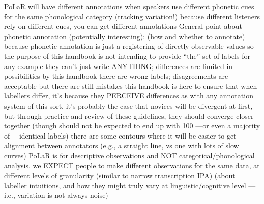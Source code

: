 \markdownRendererUlItem PoLaR will have different annotations when speakers use different phonetic cues for the same phonological category (tracking variation!)\markdownRendererUlItemEnd 
\markdownRendererUlItem because different listeners rely on different cues, you can get different annotations\markdownRendererUlItemEnd 
\markdownRendererUlEndTight \markdownRendererUlItemEnd 
\markdownRendererUlEndTight \markdownRendererUlItemEnd 
\markdownRendererUlItem General point about phonetic annotation (potentially interesting):  (how and whether to annotate) because phonetic annotation is just a registering of directly-observable values\markdownRendererInterblockSeparator
{}\markdownRendererUlBeginTight
\markdownRendererUlItem so the purpose of this handbook is not intending to provide  “the” set of labels for any example\markdownRendererInterblockSeparator
{}\markdownRendererUlBeginTight
\markdownRendererUlItem they can’t just write ANYTHING; differences are limited in possibilities by this handbook\markdownRendererInterblockSeparator
{}\markdownRendererUlBeginTight
\markdownRendererUlItem there are wrong labels; disagreements are acceptable but there are still mistakes\markdownRendererUlItemEnd 
\markdownRendererUlEndTight \markdownRendererUlItemEnd 
\markdownRendererUlItem this handbook is here to ensure that when labellers differ, it’s because they PERCEIVE differences\markdownRendererInterblockSeparator
{}\markdownRendererUlBeginTight
\markdownRendererUlItem as with any annotation system of this sort, it’s probably the case that novices will be divergent at first, but through practice and review of these guidelines, they should converge closer together (though should not be expected to end up with 100\markdownRendererPercentSign{} —or even a majority of— identical labels)\markdownRendererUlItemEnd 
\markdownRendererUlItem there are some contours where it will be easier to get alignment between annotators (e.g., a straight line, vs one with lots of slow curves)\markdownRendererUlItemEnd 
\markdownRendererUlEndTight \markdownRendererUlItemEnd 
\markdownRendererUlEndTight \markdownRendererUlItemEnd 
\markdownRendererUlItem PoLaR is for descriptive observations and NOT categorical/phonological analysis. we EXPECT people to make different observations for the same data, at different levels of granularity (similar to narrow transcription IPA)\markdownRendererInterblockSeparator
{}\markdownRendererUlBeginTight
\markdownRendererUlItem (about labeller intuitions, and how they might truly vary at linguistic/cognitive level — i.e., variation is not always noise)\markdownRendererUlItemEnd 
